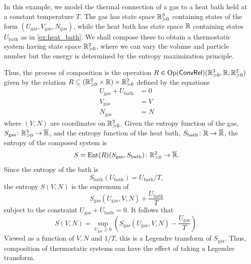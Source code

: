\documentclass[12pt, reqno]{amsart}
\DeclareMathOperator{\Op}{Op}
\newcommand{\pos}{\real_{> 0}}
\newcommand{\extreal}{\overline{\real}}
\newcommand{\convrelC}{\cat{ConvRel}}
\begin{document}
\begin{example}
\label{ex:legendre}
    In this example, we model the thermal connection of a gas to a heat bath held at a constant temperature $T$. The gas has state space $\pos^3$ containing states of the form $(U_{\mathrm{gas}}, V_{\mathrm{gas}}, N_{\mathrm{gas}})$, while the heat bath has state space $\mathbb{R}$ containing states $U_{\mathrm{bath}}$ as in \cref{ex:heat_bath}. We shall compose these to obtain a thermostatic system having state space $\pos^2$, where we can vary the volume and particle number but the energy is determined by the entropy maximization principle. 
    
    Thus, the process of composition is the operation $R \in \Op(\convrelC)(\pos^3,\real;\pos^2)$ given by the relation $R \ins (\pos^3 \times \real) \times \pos^2$ defined by the equations
    \begin{align*}
        U_{\mathrm{gas}} + U_{\mathrm{bath}} &= 0 \\
        V_{\mathrm{gas}} &= V \\
        N_{\mathrm{gas}} &= N
    \end{align*}
    where $(V,N)$ are coordinates on $\pos^2$. Given the entropy function of the gas, $S_{\mathrm{gas}} \maps \pos^3 \to \extreal$, and the entropy function of the heat bath, $S_{\mathrm{bath}} \maps \real \to \extreal$, the entropy of the composed system is
    \[   S = \Ent(R)(S_{\mathrm{gas}}, S_{\mathrm{bath}}) \maps \pos^2 \to \extreal.\]
    Since the entropy of the bath is
    \[ S_{\mathrm{bath}}(U_{\mathrm{bath}}) = U_{\mathrm{bath}}/T ,\]
    the entropy $S(V,N)$ is the supremum of
    \[S_{\mathrm{gas}}(U_\mathrm{gas},V,N) + \frac{U_\mathrm{bath}}{T}\]
    subject to the constraint $U_{\mathrm{gas}} + U_{\mathrm{bath}} = 0$. It follows that
    \[S(V,N) = \sup_{U_\mathrm{gas} \ge 0} \left( S_{\mathrm{gas}}(U_\mathrm{gas},V,N) - \frac{U_\mathrm{gas}}{T} \right).\]
    Viewed as a function of $V,N$ and $1/T$, this is a Legendre transform of $S_{\mathrm{gas}}$. Thus, composition of thermostatic systems can have the effect of taking a Legendre transform. 
\end{example}
\end{document}
